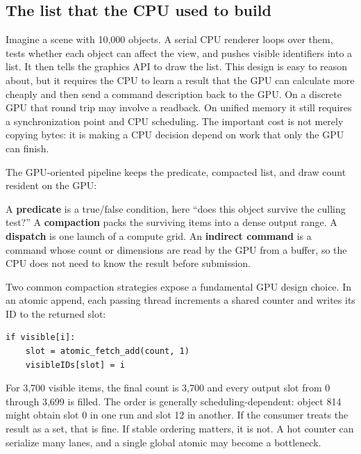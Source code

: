 \subsection{The list that the CPU used to build}\label{05-engine-i-ch019-the-list-that-the-cpu-used-to-build}

\hypertarget{05-engine-i-ch019-the-list-that-the-cpu-used-to-build}{}

Imagine a scene with 10,000 objects. A serial CPU renderer loops over them, tests whether each object can affect the view, and pushes visible identifiers into a list. It then tells the graphics API to draw the list. This design is easy to reason about, but it requires the CPU to learn a result that the GPU can calculate more cheaply and then send a command description back to the GPU. On a discrete GPU that round trip may involve a readback. On unified memory it still requires a synchronization point and CPU scheduling. The important cost is not merely copying bytes: it is making a CPU decision depend on work that only the GPU can finish.

The GPU-oriented pipeline keeps the predicate, compacted list, and draw count resident on the GPU:


A \textbf{predicate} is a true/false condition, here ``does this object survive the culling test?'' A \textbf{compaction} packs the surviving items into a dense output range. A \textbf{dispatch} is one launch of a compute grid. An \textbf{indirect command} is a command whose count or dimensions are read by the GPU from a buffer, so the CPU does not need to know the result before submission.

Two common compaction strategies expose a fundamental GPU design choice. In an atomic append, each passing thread increments a shared counter and writes its ID to the returned slot:

\begin{verbatim}
if visible[i]:
    slot = atomic_fetch_add(count, 1)
    visibleIDs[slot] = i
\end{verbatim}

For 3,700 visible items, the final count is 3,700 and every output slot from 0 through 3,699 is filled. The order is generally scheduling-dependent: object 814 might obtain slot 0 in one run and slot 12 in another. If the consumer treats the result as a set, that is fine. If stable ordering matters, it is not. A hot counter can serialize many lanes, and a single global atomic may become a bottleneck.

